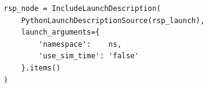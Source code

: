 \begin{figure}[t]
\centering
\begin{lstlisting}[style=python,
    caption={Namespace propagado al launch de descripción del robot.},
    label={lst:ns_rsp}]
rsp_node = IncludeLaunchDescription(
    PythonLaunchDescriptionSource(rsp_launch),
    launch_arguments={
        'namespace':    ns,
        'use_sim_time': 'false'
    }.items()
)
\end{lstlisting}
\end{figure}
